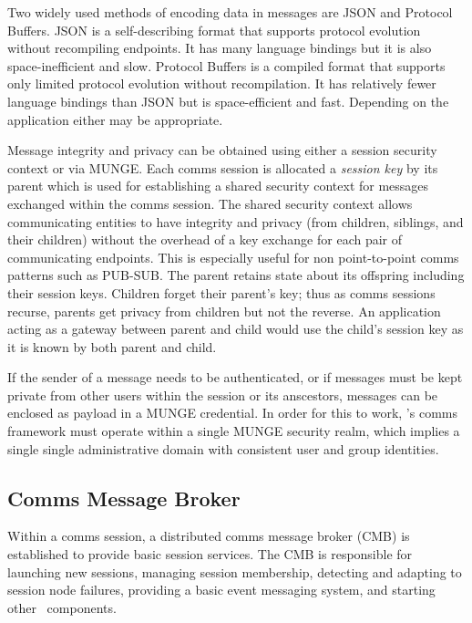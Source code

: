 Two widely used methods of encoding data in messages are
JSON\cite{rfc4627} 
and Protocol Buffers\cite{Protobuf}.
JSON is a self-describing format
that supports protocol evolution without recompiling endpoints.  It has
many language bindings but it is also space-inefficient and slow.
Protocol Buffers is a compiled format that supports
only limited protocol evolution without recompilation.  It has relatively
fewer language bindings than JSON but is space-efficient and fast.
Depending on the application either may be appropriate.

Message integrity and privacy can be obtained using either a session
security context or via MUNGE\cite{MUNGE}.
Each comms session is allocated a {\em session key} by its parent
which is used for establishing a shared security context
for messages exchanged within the comms session.
The shared security context allows communicating entities to have integrity
and privacy (from children, siblings, and their children)
without the overhead
of a key exchange for each pair of communicating endpoints.
This is especially useful for non point-to-point comms patterns such as PUB-SUB.
The parent retains state about its offspring including their session keys.
Children forget their parent's key;  thus as comms sessions recurse,
parents get privacy from children but not the reverse.
An application acting as a gateway between parent and child would use
the child's session key as it is known by both parent and child.

If the sender of a message needs to be authenticated, or if messages must
be kept private from other users within the session or its anscestors,
messages can be enclosed as payload in a MUNGE\cite{MUNGE}
credential.
In order for this to work, \ngrm's comms framework must operate within a
single MUNGE security realm,
which implies a single single administrative domain with consistent
user and group identities.

\subsection{Comms Message Broker}\label{SecCommsCMB}

Within a comms session, a distributed comms message broker (CMB)
is established to provide basic session services.
The CMB is responsible for launching new sessions,
managing session membership,
detecting and adapting to session node failures,
providing a basic event messaging system,
and starting other \ngrm\ components.

